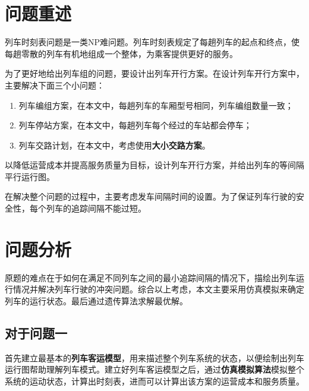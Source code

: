 \setcounter{page}{1}        %

%
%

\section{问题重述}



列车时刻表问题是一类NP难问题\cite{caoJiyuchengkedengdaishijiandechengshiguidaojiaotongliecheshikebiaoyouhuamoxingyusuanfayanjiu2021}。列车时刻表规定了每趟列车的起点和终点，使每趟零散的列车有机地组成一个整体，为乘客提供更好的服务。

为了更好地给出列车组的问题，要设计出列车开行方案。在设计列车开行方案中，主要解决下面三个小问题：

\begin{enumerate}
    \item 列车编组方案，在本文中，每趟列车的车厢型号相同，列车编组数量一致；
    \item 列车停站方案，在本文中，每趟列车每个经过的车站都会停车；
    \item 列车交路计划，在本文中，考虑使用\textbf{大小交路方案}。
\end{enumerate}

以降低运营成本并提高服务质量为目标，设计列车开行方案，并给出列车的等间隔平行运行图。

在解决整个问题的过程中，主要考虑发车间隔时间的设置。为了保证列车行驶的安全性，每个列车的追踪间隔不能过短。

%
%

\section{问题分析}

原题的难点在于如何在满足不同列车之间的最小追踪间隔的情况下，描绘出列车运行情况并解决列车行驶的冲突问题。综合以上考虑，本文主要采用仿真模拟来确定列车的运行状态。最后通过遗传算法求解最优解。

\subsection{对于问题一}

首先建立最基本的\textbf{列车客运模型}，用来描述整个列车系统的状态，以便绘制出列车运行图帮助理解列车模式。建立好列车客运模型之后，通过\textbf{仿真模拟算法}模拟整个系统的运动状态，计算出时刻表，进而可以计算出该方案的运营成本和服务质量。


